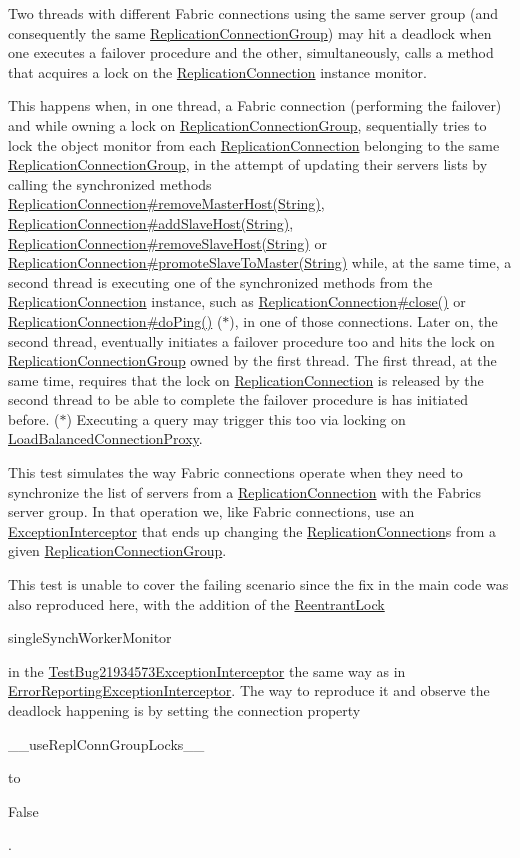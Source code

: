 Two threads with different Fabric connections using the same server group (and consequently the same \mbox{\hyperlink{}{Replication\+Connection\+Group}}) may hit a deadlock when one executes a failover procedure and the other, simultaneously, calls a method that acquires a lock on the \mbox{\hyperlink{}{Replication\+Connection}} instance monitor.

This happens when, in one thread, a Fabric connection (performing the failover) and while owning a lock on \mbox{\hyperlink{}{Replication\+Connection\+Group}}, sequentially tries to lock the object monitor from each \mbox{\hyperlink{}{Replication\+Connection}} belonging to the same \mbox{\hyperlink{}{Replication\+Connection\+Group}}, in the attempt of updating their servers lists by calling the synchronized methods \mbox{\hyperlink{}{Replication\+Connection\#remove\+Master\+Host(\+String)}}, \mbox{\hyperlink{}{Replication\+Connection\#add\+Slave\+Host(\+String)}}, \mbox{\hyperlink{}{Replication\+Connection\#remove\+Slave\+Host(\+String)}} or \mbox{\hyperlink{}{Replication\+Connection\#promote\+Slave\+To\+Master(\+String)}} while, at the same time, a second thread is executing one of the synchronized methods from the \mbox{\hyperlink{}{Replication\+Connection}} instance, such as \mbox{\hyperlink{}{Replication\+Connection\#close()}} or \mbox{\hyperlink{}{Replication\+Connection\#do\+Ping()}} ($\ast$), in one of those connections. Later on, the second thread, eventually initiates a failover procedure too and hits the lock on \mbox{\hyperlink{}{Replication\+Connection\+Group}} owned by the first thread. The first thread, at the same time, requires that the lock on \mbox{\hyperlink{}{Replication\+Connection}} is released by the second thread to be able to complete the failover procedure is has initiated before. ($\ast$) Executing a query may trigger this too via locking on \mbox{\hyperlink{}{Load\+Balanced\+Connection\+Proxy}}.

This test simulates the way Fabric connections operate when they need to synchronize the list of servers from a \mbox{\hyperlink{}{Replication\+Connection}} with the Fabric\textquotesingle{}s server group. In that operation we, like Fabric connections, use an \mbox{\hyperlink{}{Exception\+Interceptor}} that ends up changing the \mbox{\hyperlink{}{Replication\+Connection}}s from a given \mbox{\hyperlink{}{Replication\+Connection\+Group}}.

This test is unable to cover the failing scenario since the fix in the main code was also reproduced here, with the addition of the \mbox{\hyperlink{}{Reentrant\+Lock}} 
\begin{DoxyCode}
singleSynchWorkerMonitor 
\end{DoxyCode}
 in the \mbox{\hyperlink{}{Test\+Bug21934573\+Exception\+Interceptor}} the same way as in \mbox{\hyperlink{}{Error\+Reporting\+Exception\+Interceptor}}. The way to reproduce it and observe the deadlock happening is by setting the connection property
\begin{DoxyCode}
\_\_useReplConnGroupLocks\_\_ 
\end{DoxyCode}
 to
\begin{DoxyCode}
False 
\end{DoxyCode}
 .

